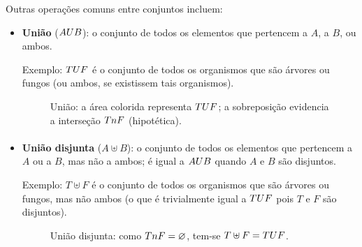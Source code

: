 \documentclass[12pt,a4paper]{article}
\def\cup{\string U}%
\def\cap{\string n}%
\begin{document}
Outras operações comuns entre conjuntos incluem:
\begin{itemize}
    \item \textbf{União} (\(A \cup B\)): o conjunto de todos os elementos que pertencem a \(A\), a \(B\), ou ambos.

          Exemplo: \(T \cup F\) é o conjunto de todos os organismos que são árvores ou fungos (ou ambos, se existissem tais organismos).
          \begin{figure}[H]
              \centering
              \caption{União: a área colorida representa $T \cup F$; a sobreposição evidencia a interseção $T \cap F$ (hipotética).}
              \label{fig:op-uniao}
          \end{figure}

          \paragraph{}
    \item \textbf{União disjunta} (\(A \uplus B\)): o conjunto de todos os elementos que pertencem a \(A\) ou a \(B\), mas não a ambos; é igual a \(A \cup B\) quando \(A\) e \(B\) são disjuntos.

          Exemplo: \(T \uplus F\) é o conjunto de todos os organismos que são árvores ou fungos, mas não ambos (o que é trivialmente igual a \(T \cup F\) pois \(T\) e \(F\) são disjuntos).
          \begin{figure}[H]
              \centering
              \caption{União disjunta: como $T \cap F= \varnothing$, tem-se $T \uplus F = T \cup F$.}
              \label{fig:op-uniao-disjunta}
          \end{figure}


\end{itemize}
\end{document}
